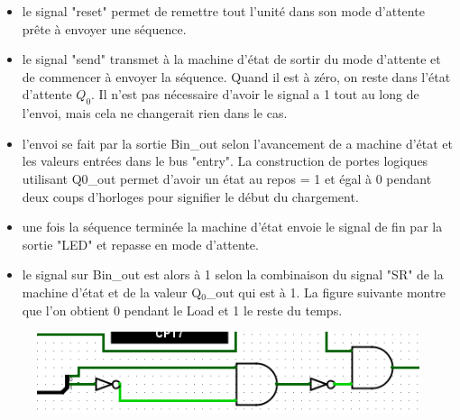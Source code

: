 \documentclass[a4paper]{article} %
\begin{document}
\begin{tcolorbox}[colframe=Monokaimagenta,colback=white, breakable, enhanced]
\begin{itemize}
	\item le signal "reset" permet de remettre tout l'unité dans son mode d'attente prête à envoyer une séquence.
	\item le signal "send" transmet à la machine d'état de sortir du mode d'attente et de commencer à envoyer la séquence. Quand il est à zéro, on reste dans l'état d'attente $Q_0$. Il n'est pas nécessaire d'avoir le signal a 1 tout au long de l'envoi, mais cela ne changerait rien dans le cas.
	\item l'envoi se fait par la sortie Bin\_out selon l'avancement de a machine d'état et les valeurs entrées dans le bus "entry". La construction de portes logiques utilisant Q0\_out permet d'avoir un état au repos = 1 et égal à 0 pendant deux coups d'horloges pour signifier le début du chargement.
	\item une fois la séquence terminée la machine d'état envoie le signal de fin par la sortie "LED" et repasse en mode d'attente.
	\item le signal sur Bin\_out est alors à 1 selon la combinaison du signal "SR" de la machine d'état et de la valeur Q$_0$\_out qui est à 1. La figure suivante montre que l'on obtient 0 pendant le Load et 1 le reste du temps.
\end{itemize}
\begin{figure}[H]
	\centering
	\includegraphics[scale=0.5]{src/bin_out_1}
	\label{fig:bin_out_1}
\end{figure}




\end{tcolorbox}
\end{document}
